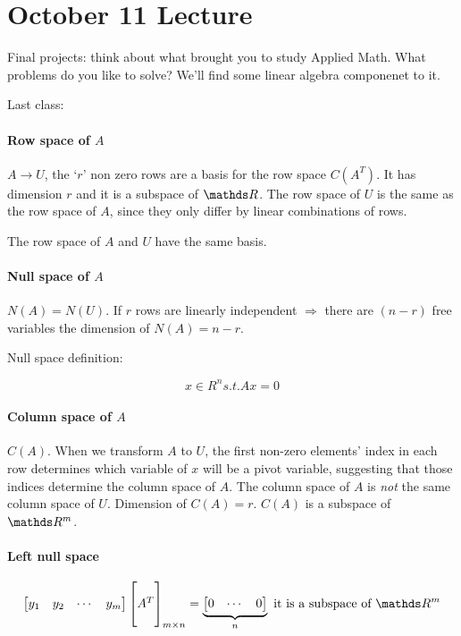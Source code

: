 \section{October 11 Lecture}

Final projects: think about what brought you to study Applied Math. What problems do you like to solve? We'll find some linear algebra componenet to it.

Last class:

\paragraph{Row space of $A$} $A \rightarrow U$, the `$r$' non zero rows are a basis for the row space $C(A^T)$. It has dimension $r$ and it is a subspace of $\bbR$. The row space of $U$ is the same as the row space of $A$, since they only differ by linear combinations of rows.

The row space of $A$ and $U$ have the same basis.

\paragraph{Null space of $A$} $N(A) = N(U)$. If $r$ rows are linearly independent $\Rightarrow$ there are $(n-r)$ free variables the dimension of $N(A) = n-r$. 

Null space definition:

\[
  x \in R^n s.t. Ax = 0
\]

\paragraph{Column space of $A$} $C(A)$. When we transform $A$ to $U$, the first non-zero elements' index in each row determines which variable of $x$ will be a pivot variable, suggesting that those indices determine the column space of $A$. The column space of $A$ is \textit{not} the same column space of $U$. Dimension of $C(A) = r$. $C(A)$ is a subspace of $\bbR^m$.

\paragraph{Left null space}

\[
  \begin{bmatrix}
    y_1 & y_2 & \cdots & y_m
  \end{bmatrix}
  \begin{bmatrix}
    \\ A^T \\ \\
  \end{bmatrix}_{m \times n} =
  \underbrace{\begin{bmatrix}
    0 & \cdots & 0
  \end{bmatrix}}_n
  \text{ it is a subspace of } \bbR^m
\]

